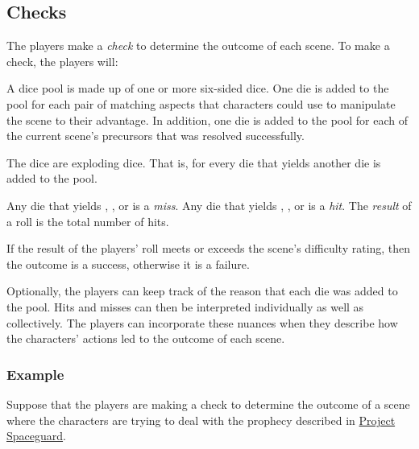 \documentclass[12pt, a5paper, parskip=half-]{scrartcl}
\begin{document}
\subsection*{Checks} \label{subsection:checks}
The players make a \emph{check} to determine the outcome of each scene.
To make a check, the players will:
\begin{description}[labelindent=0.25cm, leftmargin=\widthof{\hspace{0.25cm}\textbullet\space}, font=\normalfont\textbullet\bfseries\space]%
\item[Assemble a Dice Pool:]
     A dice pool is made up of one or more six-sided dice.
     One die is added to the pool for each pair of matching aspects that characters could use to manipulate the scene to their advantage.
     In addition, one die is added to the pool for each of the current scene's precursors that was resolved successfully.
 \item[Roll the Dice:]
     The dice are exploding dice.
     That is, for every die that yields  another die is added to the pool.
\item[Compute the Result:]
     Any die that yields , , or  is a \emph{miss}.
     Any die that yields , , or  is a \emph{hit}.
     The \emph{result} of a roll is the total number of hits.
\item[Determine the Outcome:]
     If the result of the players' roll meets or exceeds the scene's difficulty rating, then the outcome is a success,
     otherwise it is a failure.
 \end{description}
\bigskip
Optionally, the players can keep track of the reason that each die was added to the pool.  Hits and misses can then be interpreted individually as well as collectively.  The players can incorporate these nuances when they describe how the  characters' actions led to the outcome of each scene.
\newpage

\subsubsection*{Example} \label{example:checks}
Suppose that the players are making a check to determine the outcome of a scene where the characters are trying to deal with the prophecy described in \hyperref[subsection:project-spaceguard]{\cinzel \small Project Spaceguard}.
\end{document}
